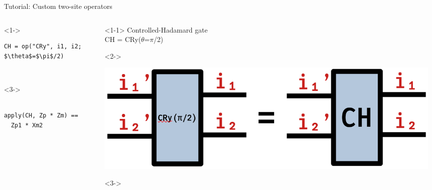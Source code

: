 \begin{frame}[fragile]{Tutorial: Custom two-site operators}

\begin{columns}

\begin{column}{5.5cm}

\begin{onlyenv}<1->
\begin{lstlisting}[language=JuliaLocal, style=julia, mathescape, basicstyle=\small]
CH = op("CRy", i1, i2; $\theta$=$\pi$/2)
\end{lstlisting}
~\\
\end{onlyenv}

\begin{onlyenv}<3->
~\\
~\\
\begin{lstlisting}[language=JuliaLocal, style=julia, mathescape, basicstyle=\small]
apply(CH, Zp * Zm) ==
  Zp1 * Xm2
\end{lstlisting}
\end{onlyenv}

\end{column}

\begin{column}{4.5cm}

\begin{onlyenv}<1-1>
Controlled-Hadamard gate \\
CH = CRy($\theta$=$\pi$/2)
\end{onlyenv}

\begin{onlyenv}<2->
\vspace*{0.0cm}
\begin{center}
\includegraphics[width=1.0\textwidth]{
  slides/assets/CH12.png
}
\end{center}
\vspace*{0.0cm}
\end{onlyenv}

\begin{onlyenv}<3->
~\\
\end{onlyenv}


\end{column}
\end{columns}
\end{frame}
